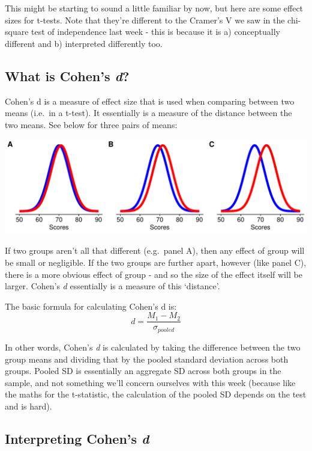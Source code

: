 \documentclass[
]{book}
\begin{document}
This might be starting to sound a little familiar by now, but here are some effect sizes for t-tests. Note that they're different to the Cramer's V we saw in the chi-square test of independence last week - this is because it is a) conceptually different and b) interpreted differently too.

\subsection{\texorpdfstring{What is Cohen's \emph{d}?}{What is Cohen's d?}}\label{what-is-cohens-d}

Cohen's d is a measure of effect size that is used when comparing between two means (i.e.~in a t-test). It essentially is a measure of the distance between the two means. See below for three pairs of means:

\includegraphics{_main_files/figure-latex/unnamed-chunk-153-1.pdf}

If two groups aren't all that different (e.g.~panel A), then any effect of group will be small or negligible. If the two groups are further apart, however (like panel C), there is a more obvious effect of group - and so the size of the effect itself will be larger. Cohen's \emph{d} essentially is a measure of this `distance'.

The basic formula for calculating Cohen's d is:
\[
d = \frac{M_1 - M_2}{\sigma_{pooled}}
\]

In other words, Cohen's \emph{d} is calculated by taking the difference between the two group means and dividing that by the pooled standard deviation across both groups. Pooled SD is essentially an aggregate SD across both groups in the sample, and not something we'll concern ourselves with this week (because like the maths for the t-statistic, the calculation of the pooled SD depends on the test and is hard).

\subsection{\texorpdfstring{Interpreting Cohen's \emph{d}}{Interpreting Cohen's d}}\label{interpreting-cohens-d}
\end{document}
